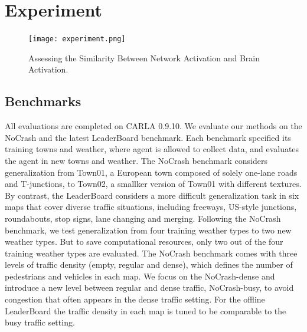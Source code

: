 \section{Experiment}
\begin{figure}[t]
	\centering
	\texttt{[image: experiment.png]}
	
	\caption{Assessing the Similarity Between Network Activation and Brain Activation.}
	\label{fig:fig3}
\end{figure}
\label{sec:experiment}

\subsection{Benchmarks} \label{sec:Dataset}

All evaluations are completed on CARLA 0.9.10. 
We evaluate our methods on the NoCrash\cite{codevilla2019exploring} and the latest LeaderBoard  benchmark.
Each benchmark specified its training towns and weather, where agent is allowed to collect data, and evaluates the agent in new towns and weather.
The NoCrash benchmark considers generalization from Town01, a European town composed of solely one-lane roads and T-junctions, to Town02, a smallker version of Town01 with different textures.
By contrast, the LeaderBoard considers a more difficult generalization task in six maps that cover diverse traffic situations, including freeways, US-style junctions, roundabouts, stop signs, lane changing and merging.
Following the NoCrash benchmark, we test generalization from four training weather types to two new weather types.
But to save computational resources, only two out of the four training weather types are evaluated.
The NoCrash benchmark comes with three levels of traffic density (empty, regular and dense), which defines the number of pedestrians and vehicles in each map.
We focus on the NoCrash-dense and introduce a new level between regular and dense traffic, NoCrash-busy, to avoid congestion that often appears in the dense traffic setting.
For the offline LeaderBoard the traffic density in each map is tuned to be comparable to the busy traffic setting. 


